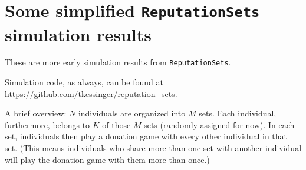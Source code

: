 \documentclass[13pt]{amsart}
\begin{document}
\section*{Some simplified \texttt{ReputationSets} simulation results}

These are more early simulation results from \texttt{ReputationSets}.

Simulation code, as always, can be found at
\url{https://github.com/tkessinger/reputation_sets}.

A brief overview:
$N$ individuals are organized into $M$ sets.
Each individual, furthermore, belongs to $K$ of those $M$ sets (randomly assigned for now).
In each set, individuals then play a donation game with every other individual in that set.
(This means individuals who share more than one set with another individual will play the donation game with them more than once.)
\end{document}

